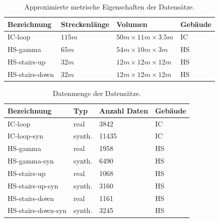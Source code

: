 \begin{table}
	\centering
	\caption{Approximierte metrische Eigenschaften der Datensätze.}
	\begin{tabularx}{1.0\textwidth}{X X X >{\centering\arraybackslash}p{1.7cm} }
		\textbf{Bezeichnung} & \textbf{Streckenlänge} & \textbf{Volumen} & \textbf{Gebäude}\\
		\hline
		IC-loop & $115m$ & $50m \times 11m \times 3.5m$ & IC \\
		\hline
		HS-gamma & $65m$ & $54m \times 10m \times 3m$ & HS\\
		\hline
		HS-stairs-up & $32m$ & $12m \times 12m \times 12m$ & HS\\
		\hline
		HS-stairs-down & $32m$ & $12m \times 12m \times 12m$ & HS\\
	\end{tabularx}
	\label{tab:dataset_metrics}
\end{table}


\begin{table}
	\centering
	\caption{Datenmenge der Datensätze.}
	\begin{tabularx}{1.0\textwidth}{p{3.5cm} p{1.8cm} X  >{\centering\arraybackslash}p{1.7cm} }
		\textbf{Bezeichnung} & \textbf{Typ} & \textbf{Anzahl Daten} & \textbf{Gebäude}\\
		\hline
		IC-loop & real & 3842 & IC\\
		\hline
		IC-loop-syn & synth. & 11435 & IC\\
		\hline
		HS-gamma & real & 1958 & HS\\
		\hline
		HS-gamma-syn & synth. &  6490 & HS\\
		\hline
		HS-stairs-up & real & 1068 & HS\\
		\hline
		HS-stairs-up-syn & synth. & 3160 & HS\\
		\hline
		HS-stairs-down & real & 1161 & HS\\
		\hline
		HS-stairs-down-syn & synth. &  3245 & HS\\
	\end{tabularx}
	\label{tab:datasets}
\end{table}


\cleardoublepage

